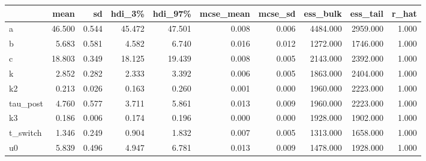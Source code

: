 \begin{tabular}{lrrrrrrrrr}
\toprule
 & mean & sd & hdi\_3\% & hdi\_97\% & mcse\_mean & mcse\_sd & ess\_bulk & ess\_tail & r\_hat \\
\midrule
a & 46.500 & 0.544 & 45.472 & 47.501 & 0.008 & 0.006 & 4484.000 & 2959.000 & 1.000 \\
b & 5.683 & 0.581 & 4.582 & 6.740 & 0.016 & 0.012 & 1272.000 & 1746.000 & 1.000 \\
c & 18.803 & 0.349 & 18.125 & 19.439 & 0.008 & 0.005 & 2143.000 & 2392.000 & 1.000 \\
k & 2.852 & 0.282 & 2.333 & 3.392 & 0.006 & 0.005 & 1863.000 & 2404.000 & 1.000 \\
k2 & 0.213 & 0.026 & 0.163 & 0.260 & 0.001 & 0.000 & 1960.000 & 2223.000 & 1.000 \\
tau\_post & 4.760 & 0.577 & 3.711 & 5.861 & 0.013 & 0.009 & 1960.000 & 2223.000 & 1.000 \\
k3 & 0.186 & 0.006 & 0.174 & 0.196 & 0.000 & 0.000 & 1928.000 & 1902.000 & 1.000 \\
t\_switch & 1.346 & 0.249 & 0.904 & 1.832 & 0.007 & 0.005 & 1313.000 & 1658.000 & 1.000 \\
u0 & 5.839 & 0.496 & 4.947 & 6.781 & 0.013 & 0.009 & 1478.000 & 1928.000 & 1.000 \\
\bottomrule
\end{tabular}
